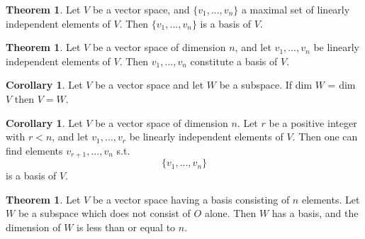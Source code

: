 \documentclass{book}
\theoremstyle{definition}
\newtheorem{theorem}[definition]{Theorem}
\newtheorem{corollary}[definition]{Corollary}
\begin{document}
\begin{theorem}
Let $V$ be a vector space, and $\{v_1,...,v_n\}$ a maximal set of linearly independent elements of $V$. Then $\{v_1,...,v_n\}$ is a basis of $V$.
\end{theorem}
\begin{theorem}
Let $V$ be a vector space of dimension $n$, and let $v_1,...,v_n$ be linearly independent elements of $V$. Then $v_1, ..., v_n$ constitute a basis of $V$.
\end{theorem}
\begin{corollary}
Let $V$ be a vector space and let $W$ be a subspace. If dim $W$ = dim $V$ then $V=W$.
\end{corollary}
\begin{corollary}
Let $V$ be a vector space of dimension $n$. Let $r$ be a positive integer with $r<n$, and let $v_1, ..., v_r$ be linearly independent elements of $V$. Then one can find elements $v_{r+1},...,v_n$ s.t.
\begin{equation*}
    \{v_1,...,v_n\}
\end{equation*}
is a basis of $V$.
\end{corollary}
\begin{theorem}
Let $V$ be a vector space having a basis consisting of $n$ elements. Let $W$ be a subspace which does not consist of $O$ alone. Then $W$ has a basis, and the dimension of $W$ is less than or equal to $n$.
\end{theorem}
\end{document}
